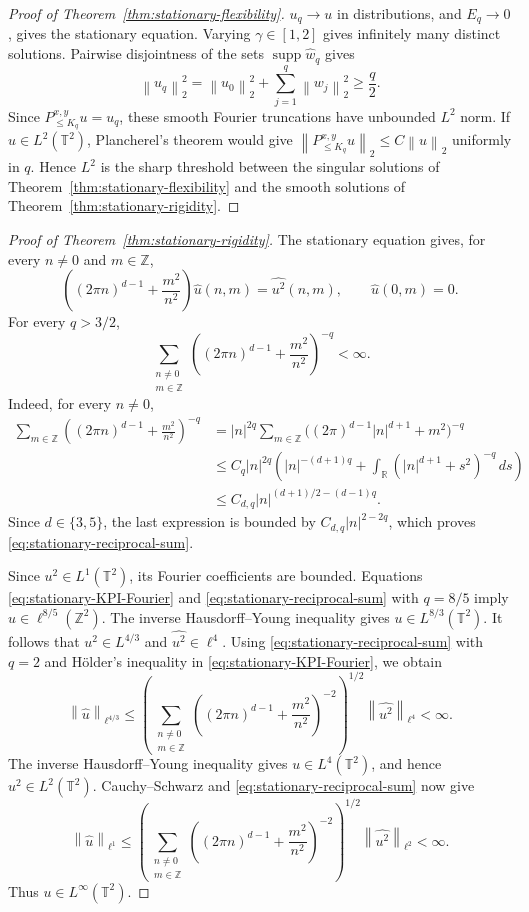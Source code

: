 \documentclass[12pt,reqno,letterpaper]{amsart}
\numberwithin{equation}{section}
\theoremstyle{definition}
\newcommand{\T}{\mathbb T}
\newcommand{\R}{\mathbb R}
\newcommand{\Z}{\mathbb Z}
\newcommand{\supp}{\operatorname{supp}}
\newcommand{\norm}[1]{\left\lVert #1\right\rVert}
\begin{document}
\begin{proof}[Proof of Theorem~\ref{thm:stationary-flexibility}]
$u_q\to u$ in distributions, and $E_q\to0$, gives the stationary
equation.  Varying
$\gamma\in[1,2]$ gives infinitely many distinct solutions.
Pairwise disjointness of the sets $\supp\widehat w_q$ gives
\[
 \norm{u_q}_2^2
 =\norm{u_0}_2^2+\sum_{j=1}^q\norm{w_j}_2^2
 \geq\frac q2.
\]
Since $P_{\leq K_q}^{x,y}u=u_q$, these smooth Fourier truncations have
unbounded $L^2$ norm.  If $u\in L^2(\T^2)$, Plancherel's theorem would
give $\norm{P_{\leq K_q}^{x,y}u}_2\leq C\norm u_2$ uniformly in
$q$.  Hence $L^2$ is the sharp threshold between the singular solutions
of Theorem~\ref{thm:stationary-flexibility} and the smooth solutions of
Theorem~\ref{thm:stationary-rigidity}.
\end{proof}

\begin{proof}[Proof of Theorem~\ref{thm:stationary-rigidity}]
The stationary equation gives, for every $n\neq0$ and $m\in\Z$,
\begin{equation}\label{eq:stationary-KPI-Fourier}
 \left((2\pi n)^{d-1}+\frac{m^2}{n^2}\right)\widehat u(n,m)
 =\widehat{u^2}(n,m),
 \qquad \widehat u(0,m)=0.
\end{equation}
For every $q>3/2$,
\begin{equation}\label{eq:stationary-reciprocal-sum}
 \sum_{\substack{n\neq0\\m\in\Z}}
 \left((2\pi n)^{d-1}+\frac{m^2}{n^2}\right)^{-q}<\infty.
\end{equation}
Indeed, for every $n\neq0$,
\begin{align*}
 \sum_{m\in\Z}
 \left((2\pi n)^{d-1}+\frac{m^2}{n^2}\right)^{-q}
 &=|n|^{2q}\sum_{m\in\Z}
       \bigl((2\pi)^{d-1}|n|^{d+1}+m^2\bigr)^{-q}\\
 &\leq C_q|n|^{2q}
       \left(|n|^{-(d+1)q}
       +\int_{\R}(|n|^{d+1}+s^2)^{-q}\,ds\right)
 \\
 &\leq C_{d,q}|n|^{(d+1)/2-(d-1)q}.
\end{align*}
Since $d\in\{3,5\}$, the last expression is bounded by
$C_{d,q}|n|^{2-2q}$, which proves
\eqref{eq:stationary-reciprocal-sum}.

Since $u^2\in L^1(\T^2)$, its Fourier coefficients are bounded.
Equations \eqref{eq:stationary-KPI-Fourier} and
\eqref{eq:stationary-reciprocal-sum} with $q=8/5$ imply
$\widehat u\in\ell^{8/5}(\Z^2)$.  The inverse Hausdorff--Young inequality gives
$u\in L^{8/3}(\T^2)$.  It follows that
$u^2\in L^{4/3}$ and
$\widehat{u^2}\in\ell^4$.  Using
\eqref{eq:stationary-reciprocal-sum} with $q=2$ and H\"older's inequality
in \eqref{eq:stationary-KPI-Fourier}, we obtain
\[
 \norm{\widehat u}_{\ell^{4/3}}
 \leq
 \left(\sum_{\substack{n\neq0\\m\in\Z}}
 \left((2\pi n)^{d-1}+\frac{m^2}{n^2}\right)^{-2}\right)^{1/2}
 \norm{\widehat{u^2}}_{\ell^4}<\infty.
\]
The inverse Hausdorff--Young inequality gives $u\in L^4(\T^2)$, and hence
$u^2\in L^2(\T^2)$.  Cauchy--Schwarz and
\eqref{eq:stationary-reciprocal-sum} now give
\[
 \norm{\widehat u}_{\ell^1}
 \leq
 \left(\sum_{\substack{n\neq0\\m\in\Z}}
 \left((2\pi n)^{d-1}+\frac{m^2}{n^2}\right)^{-2}\right)^{1/2}
 \norm{\widehat{u^2}}_{\ell^2}<\infty.
\]
Thus $u\in L^\infty(\T^2)$.


\end{proof}
\end{document}
